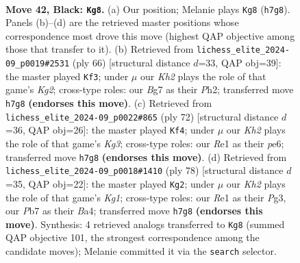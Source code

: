 \documentclass[11pt]{article}
\begin{document}
\clearpage

\begin{figure}[p]\centering
\begin{subfigure}{0.46\textwidth}\centering
\resizebox{\linewidth}{!}{%
\newchessgame
\chessboard[
  setfen={2N5/1p4bk/6p1/5p1p/Pr6/R5PP/5PK1/4r3 b - - 0 42},
  showmover=false,
  pgfstyle=straightmove, color=movearrow, markmove={h7-g8}
]}
\caption{}
\end{subfigure}\hfill
\begin{subfigure}{0.46\textwidth}\centering
\resizebox{\linewidth}{!}{%
\newchessgame
\chessboard[
  setfen={8/5k1p/1pr3p1/pR6/P7/4P3/1P3PKP/8 w - - 0 34},
  showmover=false,
  pgfstyle=straightmove, color=movearrow, markmove={g2-f3}
]}
\caption{}
\end{subfigure}
\\[4pt]
\begin{subfigure}{0.46\textwidth}\centering
\resizebox{\linewidth}{!}{%
\newchessgame
\chessboard[
  setfen={8/pr3pk1/R3p1pp/8/6PP/5PK1/8/8 w - - 3 37},
  showmover=false,
  pgfstyle=straightmove, color=movearrow, markmove={g3-f4}
]}
\caption{}
\end{subfigure}\hfill
\begin{subfigure}{0.46\textwidth}\centering
\resizebox{\linewidth}{!}{%
\newchessgame
\chessboard[
  setfen={8/1r4k1/3r2pp/5p2/B1Rp3P/3P2P1/5P2/6K1 w - - 0 40},
  showmover=false,
  pgfstyle=straightmove, color=movearrow, markmove={g1-g2}
]}
\caption{}
\end{subfigure}
\caption{\textbf{Move 42, Black: \texttt{Kg8}.} (a) Our position; Melanie plays \texttt{Kg8} (\texttt{h7g8}). Panels (b)--(d) are the retrieved master positions whose correspondence most drove this move (highest QAP objective among those that transfer to it). (b) Retrieved from \texttt{lichess\_elite\_2024-09\_p0019\#2531} (ply 66) [structural distance $d$=33, QAP obj=39]: the master played \texttt{Kf3}; under $\mu$ our \emph{Kh2} plays the role of that game's \emph{Kg2}; cross-type roles: our \emph{B}g7 as their \emph{P}h2; transferred move \texttt{h7g8} \textbf{(endorses this move)}. (c) Retrieved from \texttt{lichess\_elite\_2024-09\_p0022\#865} (ply 72) [structural distance $d$=36, QAP obj=26]: the master played \texttt{Kf4}; under $\mu$ our \emph{Kh2} plays the role of that game's \emph{Kg3}; cross-type roles: our \emph{R}e1 as their \emph{p}e6; transferred move \texttt{h7g8} \textbf{(endorses this move)}. (d) Retrieved from \texttt{lichess\_elite\_2024-09\_p0018\#1410} (ply 78) [structural distance $d$=35, QAP obj=22]: the master played \texttt{Kg2}; under $\mu$ our \emph{Kh2} plays the role of that game's \emph{Kg1}; cross-type roles: our \emph{R}e1 as their \emph{P}g3, our \emph{P}b7 as their \emph{B}a4; transferred move \texttt{h7g8} \textbf{(endorses this move)}. Synthesis: 4 retrieved analogs transferred to \texttt{Kg8} (summed QAP objective 101, the strongest correspondence among the candidate moves); Melanie committed it via the \texttt{search} selector.}
\label{fig:thought-m83}
\end{figure}
\end{document}
